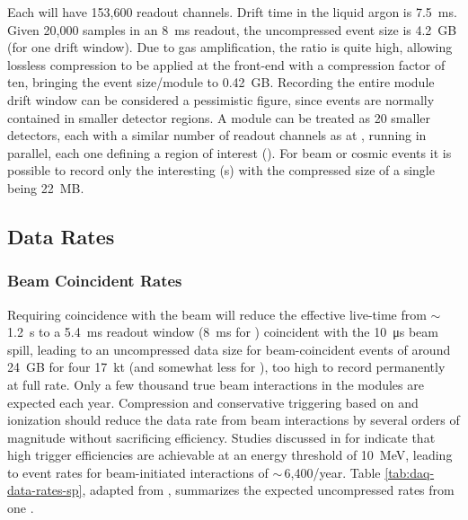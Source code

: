 Each  will have 153,600 readout channels. Drift time in the liquid argon is \SI{7.5}{ms}. Given 20,000 samples in an \SI{8}{ms} readout, the uncompressed event size is \SI{4.2}{GB} (for one drift window).  Due to gas amplification, the  ratio is quite high, allowing lossless compression to be applied at the front-end  with a compression factor of ten, bringing the event size/module to \SI{.42}{GB}. Recording the entire module drift window can be considered a pessimistic figure,  since events are normally contained in smaller detector regions. A   module can be treated as 20 smaller  detectors, each with a similar number  of readout channels as  %
at , running in parallel, each one defining a region of interest  (). For beam or cosmic events it is possible to record only the interesting (s) with the compressed size of a single  being \SI{22}{MB}.

\subsection{Data Rates}
\subsubsection{Beam Coincident Rates}

Requiring  coincidence with the  beam will reduce the effective live-time from $\sim\,$\SI{1.2}{s}  to a \SI{5.4}{ms}  readout window (\SI{8}{ms} for ) coincident with the \SI{10}{\micro\second} beam spill, leading to an uncompressed data size for beam-coincident events of around \SI{24}{GB} for four \SI{17}{kt}  (and somewhat less for ), too high to record permanently at full rate.
Only a few thousand true beam interactions in the  modules are expected each year.  Compression and conservative triggering based on  and ionization should reduce the data rate from beam interactions by several orders of magnitude without sacrificing efficiency.  Studies discussed in %
\spchdaq{} for  
indicate that high trigger efficiencies are achievable at an energy threshold of \SI{10}{MeV}, leading to event rates for beam-initiated  interactions of $\sim\,$6,400/year.
Table \ref{tab:daq-data-rates-sp}, adapted from \spchdaq{}, %
 summarizes the expected uncompressed rates from one . 

